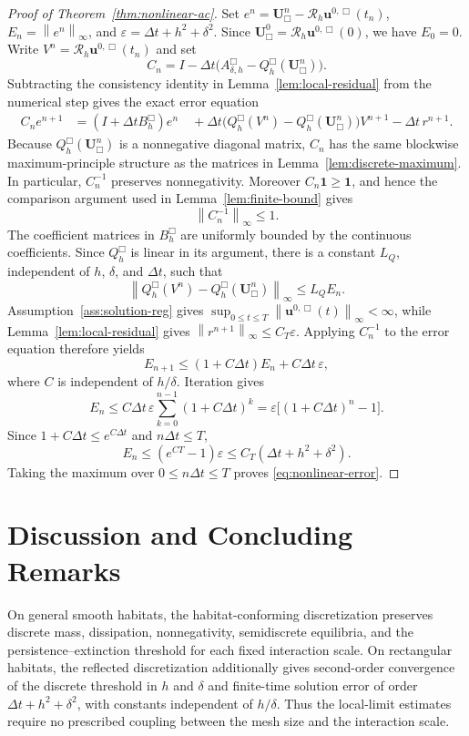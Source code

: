 \documentclass[11pt]{article}
\theoremstyle{definition}
\newcommand{\cR}{\mathcal{R}}
\newcommand{\norm}[1]{\left\lVert #1\right\rVert}
\newcommand{\one}{\mathbf{1}}
\newcommand{\U}{\bm U}
\newcommand{\uvec}{\bm u}
\begin{document}
\begin{proof}[Proof of Theorem~\ref{thm:nonlinear-ac}]
Set $e^n=\U_{\Box}^n-\cR_h\uvec^{0,\Box}(t_n)$, $E_n=\norm{e^n}_\infty$, and $\varepsilon=\Delta t+h^2+\delta^2$.  Since $\U_{\Box}^0=\cR_h\uvec^{0,\Box}(0)$, we have $E_0=0$.  Write
$V^n=\cR_h\uvec^{0,\Box}(t_n)$ and set
\[
 C_n
 =I-\Delta t\big(A_{\delta,h}^{\Box}-Q_h^{\Box}(\U_{\Box}^n)\big).
\]
Subtracting the consistency identity in Lemma~\ref{lem:local-residual} from
the numerical step gives the exact error equation
\[
 \begin{aligned}
 C_n e^{n+1}
 &=
 (I+\Delta t B_h^{\Box})e^n \quad
 +\Delta t\big(Q_h^{\Box}(V^n)-Q_h^{\Box}(\U_{\Box}^n)\big)V^{n+1}
 -\Delta t\,r^{n+1}.
 \end{aligned}
\]
Because $Q_h^{\Box}(\U_{\Box}^n)$ is a nonnegative diagonal matrix,
$C_n$ has the same blockwise maximum-principle structure as the matrices in
Lemma~\ref{lem:discrete-maximum}.  In particular, $C_n^{-1}$ preserves
nonnegativity.  Moreover $C_n\one\ge\one$, and hence the comparison argument
used in Lemma~\ref{lem:finite-bound} gives
\[
 \norm{C_n^{-1}}_\infty\le1.
\]
The coefficient matrices in $B_h^{\Box}$ are uniformly bounded by the
continuous coefficients.  Since $Q_h^{\Box}$ is linear in its argument,
there is a constant $L_Q$, independent of $h$, $\delta$, and $\Delta t$, such
that
\[
 \norm{Q_h^{\Box}(V^n)-Q_h^{\Box}(\U_{\Box}^n)}_\infty
 \le L_Q E_n.
\]
Assumption~\ref{ass:solution-reg} gives
$\sup_{0\le t\le T}\norm{\uvec^{0,\Box}(t)}_\infty<\infty$, while
Lemma~\ref{lem:local-residual} gives
$\norm{r^{n+1}}_\infty\le C_T\varepsilon$.  Applying $C_n^{-1}$ to the
error equation therefore yields
\[
 E_{n+1}
 \le
 (1+C\Delta t)E_n
 +C\Delta t\,\varepsilon,
\]
where $C$ is independent of $h/\delta$.  Iteration gives
\[
 E_n
 \le
 C\Delta t\,\varepsilon
 \sum_{k=0}^{n-1}(1+C\Delta t)^k
 =
 \varepsilon\big[(1+C\Delta t)^n-1\big].
\]
Since $1+C\Delta t\le e^{C\Delta t}$ and $n\Delta t\le T$,
\[
 E_n
 \le
 (e^{CT}-1)\varepsilon
 \le
 C_T(\Delta t+h^2+\delta^2).
\]
Taking the maximum over $0\le n\Delta t\le T$ proves
\eqref{eq:nonlinear-error}.
\end{proof}

\section{Discussion and Concluding Remarks}
\label{sec:discussion-conclusion}
On general smooth habitats, the habitat-conforming discretization preserves
discrete mass, dissipation, nonnegativity, semidiscrete equilibria, and the
persistence--extinction threshold for each fixed interaction scale.  On
rectangular habitats, the reflected discretization additionally gives
second-order convergence of the discrete threshold in $h$ and $\delta$ and
finite-time solution error of order $\Delta t+h^2+\delta^2$, with constants
independent of $h/\delta$.  Thus the local-limit estimates require no prescribed
coupling between the mesh size and the interaction scale.
\end{document}
